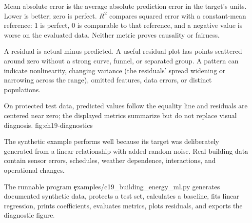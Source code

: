 Mean absolute error is the average absolute prediction error in the target's
units. Lower is better; zero is perfect. $R^2$ compares squared error with a
constant-mean reference: 1 is perfect, 0 is comparable to that reference, and a
negative value is worse on the evaluated data. Neither metric proves causality
or fairness.


A residual is actual minus predicted. A useful residual plot has points
scattered around zero without a strong curve, funnel, or separated group. A
pattern can indicate nonlinearity, changing variance (the residuals' spread
widening or narrowing across the range), omitted features, data errors, or
distinct populations.

{On protected test data, predicted values follow the equality line and residuals are centered near zero; the displayed metrics summarize but do not replace visual diagnosis.}
{fig:ch19-diagnostics}

The synthetic example performs well because its target was deliberately
generated from a linear relationship with added random noise. Real building data contain sensor
errors, schedules, weather dependence, interactions, and operational changes.

\label{sec:c19-application}

The runnable program \c{examples/c19_building_energy_ml.py} generates documented
synthetic data, protects a test set, calculates a baseline, fits linear
regression, prints coefficients, evaluates metrics, plots residuals, and exports
the diagnostic figure.

